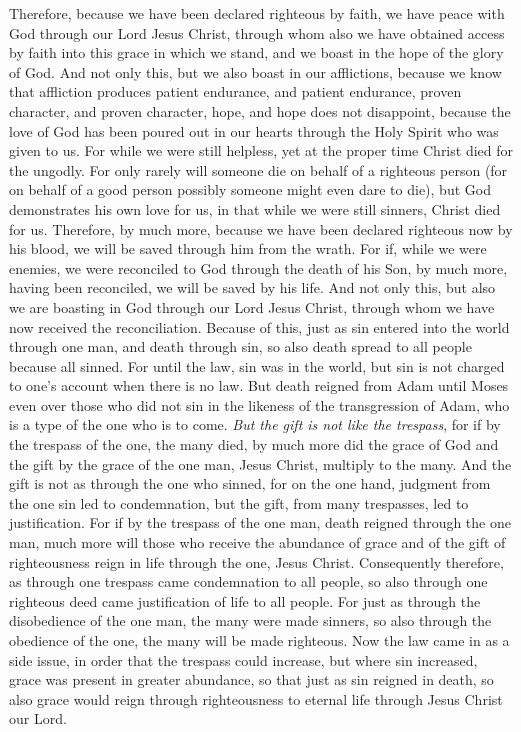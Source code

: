 \begin{biblechapter} %
 Therefore, because we have been declared righteous by faith, we have peace with God through our Lord Jesus Christ,
\verse through whom also we have obtained access by faith into this grace in which we stand, and we boast in the hope of the glory of God.
\verse And not only this, but we also boast in our afflictions, because we know that affliction produces patient endurance,
\verse and patient endurance, proven character, and proven character, hope,
\verse and hope does not disappoint, because the love of God has been poured out in our hearts through the Holy Spirit who was given to us.
\verse For while we were still helpless, yet at the proper time Christ died for the ungodly.
\verse For only rarely will someone die on behalf of a righteous person (for on behalf of a good person possibly someone might even dare to die),
\verse but God demonstrates his own love for us, in that while we were still sinners, Christ died for us.
\verse Therefore, by much more, because we have been declared righteous now by his blood, we will be saved through him from the wrath.
\verse For if, while we were enemies, we were reconciled to God through the death of his Son, by much more, having been reconciled, we will be saved by his life.
\verse And not only this, but also we are boasting in God through our Lord Jesus Christ, through whom we have now received the reconciliation.
 Because of this, just as sin entered into the world through one man, and death through sin, so also death spread to all people because all sinned.
\verse For until the law, sin was in the world, but sin is not charged to one’s account when there is no law.
\verse But death reigned from Adam until Moses even over those who did not sin in the likeness of the transgression of Adam, who is a type of the one who is to come.
\verse \textit{But the gift is not like the trespass}, for if by the trespass of the one, the many died, by much more did the grace of God and the gift by the grace of the one man, Jesus Christ, multiply to the many.
\verse And the gift is not as through the one who sinned, for on the one hand, judgment from the one sin led to condemnation, but the gift, from many trespasses, led to justification.
\verse For if by the trespass of the one man, death reigned through the one man, much more will those who receive the abundance of grace and of the gift of righteousness reign in life through the one, Jesus Christ.
\verse Consequently therefore, as through one trespass came condemnation to all people, so also through one righteous deed came justification of life to all people.
\verse For just as through the disobedience of the one man, the many were made sinners, so also through the obedience of the one, the many will be made righteous.
\verse Now the law came in as a side issue, in order that the trespass could increase, but where sin increased, grace was present in greater abundance,
\verse so that just as sin reigned in death, so also grace would reign through righteousness to eternal life through Jesus Christ our Lord.
\end{biblechapter}

